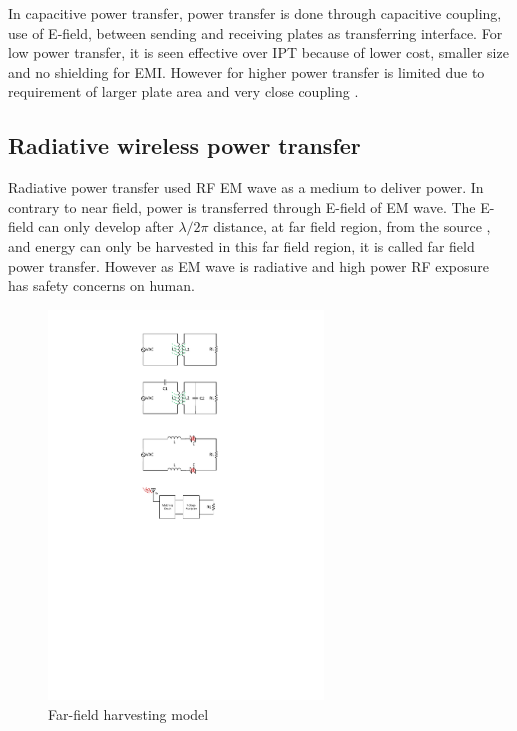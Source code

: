 \documentclass[12pt,a4paper,UKenglish]{report}
\begin{document}
In capacitive power transfer, power transfer is done through capacitive coupling, use of E-field, between sending 
and receiving plates as transferring interface. For low power transfer, it is seen effective over IPT because of 
lower cost, smaller size and no shielding for EMI. However for higher power transfer is limited due to 
requirement of larger plate area and very close coupling \cite{wpt_cpt}. \\

\subsection{Radiative wireless power transfer}

Radiative power transfer used RF EM wave as a medium to deliver power. In contrary to near field, power is 
transferred through E-field of EM wave. The E-field can only develop after $\lambda /2\pi$ distance, at far 
field region, from the source \cite[pp. 112]{rfid_2010}, and energy can only be harvested in this far field 
region, it is called far field power transfer. However as EM wave is radiative and high power RF exposure has 
safety concerns on human. \\

\begin{figure}[htbp] %
   \centering
   \includegraphics[width=0.65\textwidth]{img/visio_rf.pdf}
   \caption{Far-field harvesting model}
   \label{fig:visio_model_far}
\end{figure}
\end{document}
